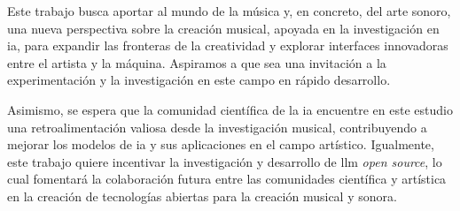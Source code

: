 Este trabajo busca aportar al mundo de la música y, en concreto, del arte sonoro, una nueva perspectiva sobre la creación musical, apoyada en la investigación en \gls{ia}, para expandir las fronteras de la creatividad y explorar interfaces innovadoras entre el artista y la máquina. Aspiramos a que sea una invitación a la experimentación y la investigación en este campo en rápido desarrollo.

Asimismo, se espera que la comunidad científica de la \gls{ia} encuentre en este estudio una retroalimentación valiosa desde la investigación musical, contribuyendo a mejorar los modelos de \gls{ia} y sus aplicaciones en el campo artístico. Igualmente, este trabajo quiere incentivar la investigación y desarrollo de \gls{llm} \emph{open source}, lo cual fomentará la colaboración futura entre las comunidades científica y artística en la creación de tecnologías abiertas para la creación musical y sonora.